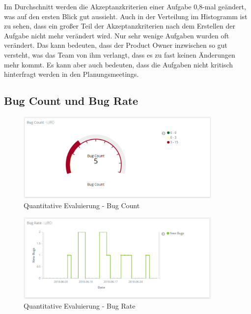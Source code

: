 Im Durchschnitt werden die Akzeptanzkriterien einer Aufgabe 0,8-mal geändert, was auf den ersten Blick gut aussieht.
Auch in der Verteilung im Histogramm ist zu sehen, dass ein großer Teil der Akzeptanzkriterien nach dem Erstellen der Aufgabe nicht mehr verändert wird.
Nur sehr wenige Aufgaben wurden oft verändert.
Das kann bedeuten, dass der Product Owner inzwischen so gut versteht, was das Team von ihm verlangt, dass es zu fast keinen Änderungen mehr kommt.
Es kann aber auch bedeuten, dass die Aufgaben nicht kritisch hinterfragt werden in den Planungsmeetings.

\clearpage
\subsection*{Bug Count und Bug Rate}

\begin{savenotes}
    \begin{figure}[H]
      \centering
      \includegraphics[width=0.9\textwidth]{img/eval-bug-count.png}
      \caption{Quantitative Evaluierung {-} Bug Count}\label{fig:eval_bug_count}
    \end{figure}
\end{savenotes}

\begin{savenotes}
    \begin{figure}[H]
      \centering
      \includegraphics[width=0.9\textwidth]{img/eval-bug-rate.png}
      \caption{Quantitative Evaluierung {-} Bug Rate}\label{fig:eval_bug_rate}
    \end{figure}
\end{savenotes}

